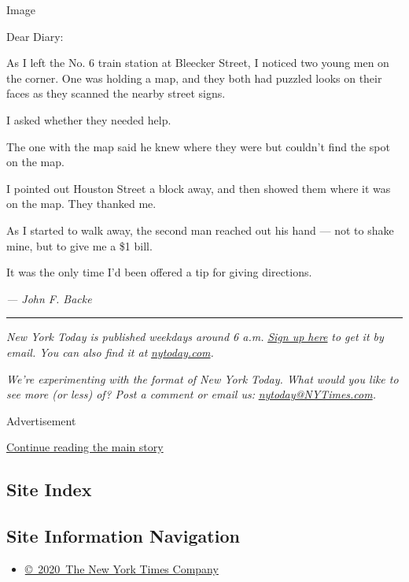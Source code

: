 Image

Dear Diary:

As I left the No. 6 train station at Bleecker Street, I noticed two
young men on the corner. One was holding a map, and they both had
puzzled looks on their faces as they scanned the nearby street signs.

I asked whether they needed help.

The one with the map said he knew where they were but couldn't find the
spot on the map.

I pointed out Houston Street a block away, and then showed them where it
was on the map. They thanked me.

As I started to walk away, the second man reached out his hand --- not
to shake mine, but to give me a \$1 bill.

It was the only time I'd been offered a tip for giving directions.

\emph{--- John F. Backe}

\begin{center}\rule{0.5\linewidth}{\linethickness}\end{center}

\emph{New York Today is published weekdays around 6 a.m.}
\href{https://www.nytimes3xbfgragh.onion/newsletters/newyorktoday?module=inline}{\emph{Sign
up here}} \emph{to get it by email. You can also find it at}
\href{http://www.nytoday.com/}{\emph{nytoday.com}}\emph{.}

\emph{We're experimenting with the format of New York Today. What would
you like to see more (or less) of? Post a comment or email us:}
\href{mailto:nytoday@NYTimes.com}{\emph{nytoday@NYTimes.com}}\emph{.}

Advertisement

\protect\hyperlink{after-bottom}{Continue reading the main story}

\hypertarget{site-index}{%
\subsection{Site Index}\label{site-index}}

\hypertarget{site-information-navigation}{%
\subsection{Site Information
Navigation}\label{site-information-navigation}}

\begin{itemize}
\tightlist
\item
  \href{https://help.nytimes3xbfgragh.onion/hc/en-us/articles/115014792127-Copyright-notice}{©~2020~The
  New York Times Company}
\end{itemize}

